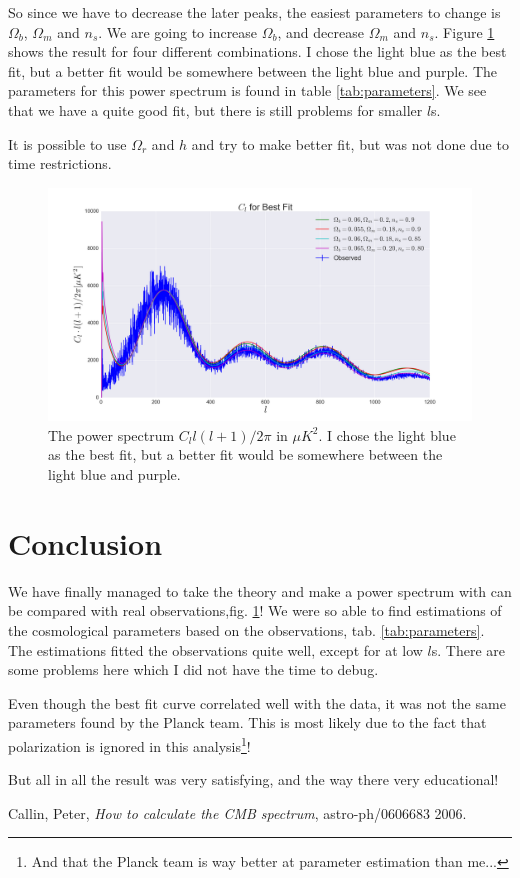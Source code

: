 \documentclass[a4paper,norsk, 10pt]{article}
\begin{document}
So since we have to decrease the later peaks, the easiest parameters to change is $\Omega_b$, $\Omega_m$ and $n_s$. We are going to increase $\Omega_b$, and decrease $\Omega_m$ and $n_s$. Figure \ref{fig:Cl_bf} shows the result for four different combinations. I chose the light blue as the best fit, but a better fit would be somewhere between the light blue and purple. The parameters for this power spectrum is found in table \ref{tab:parameters}. We see that we have a quite good fit, but there is still problems for smaller $l$s. 

It is possible to use $\Omega_r$ and $h$ and try to make better fit, but was not done due to time restrictions. 


\begin{figure}[!htbp]
\centering
\includegraphics[scale=0.25]{Cl_bf.png}
\caption{The power spectrum $C_l l(l+1)/2\pi$ in $\mu K^2$. I chose the light blue as the best fit, but a better fit would be somewhere between the light blue and purple.}\label{fig:Cl_bf}
\end{figure}

\section{Conclusion}

We have finally managed to take the theory and make a power spectrum with can be compared with real observations,fig. \ref{fig:Cl_bf}! We were so able to find estimations of the cosmological parameters based on the observations, tab. \ref{tab:parameters}. The estimations fitted the observations quite well, except for at low $l$s. There are some problems here which I did not have the time to debug.

Even though the best fit curve correlated well with the data, it was not the same parameters found by the Planck team. This is most likely due to the fact that polarization is ignored in this analysis\footnote{And that the Planck team is way better at parameter estimation than me...}!

But all in all the result was very satisfying, and the way there very educational!



\begin{thebibliography}{9}

  Callin, Peter,
  \textit{How to calculate the CMB spectrum},
  astro-ph/0606683
  2006.

\end{thebibliography}
\end{document}
